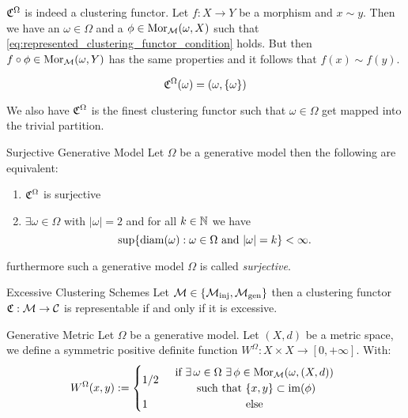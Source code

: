$\mathfrak{C}^\Omega$ is indeed a clustering functor. Let $f: X \to Y$ be a morphism and $x \sim y$. Then we have an $\omega \in \Omega$ and a $\phi \in \mathrm {Mor}_{\mathcal{M}}(\omega, X)$ such that \eqref{eq:represented_clustering_functor_condition} holds. But then $f \circ \phi \in \mathrm {Mor}_{\mathcal{M}}(\omega,Y)$ has the same properties and it follows that $f(x) \sim f(y)$.

\begin{myremark}{}{}

$$
\mathfrak{C}^\Omega(\omega) = (\omega, \{\omega\})
$$

We also have $\mathfrak{C}^\Omega$ is the finest clustering functor such that $\omega \in \Omega$ get mapped into the trivial partition.
\end{myremark}

\begin{proposition}{Surjective Generative Model}{}
\newresult
Let $\Omega$ be a generative model then the following are equivalent:
\begin{enumerate}
    \item $\mathfrak{C}^\Omega$ is surjective
    \item $\exists \omega \in \Omega$ with $|\omega| = 2$ and for all $k \in \mathbb N$ we have 
    $$
    \sup\{\mathrm{diam}(\omega): \omega \in \Omega \text{ and } |\omega| = k\} < \infty.
    $$ 
\end{enumerate}
furthermore such a generative model $\Omega$ is called \emph{surjective}.
\end{proposition}





\begin{theorem}{Excessive Clustering Schemes}{}
Let $\mathcal{M} \in \{{\mathcal{M}_\mathrm{inj}}, {\mathcal{M}_\mathrm{gen}}\}$ then a clustering functor $\mathfrak{C}: \mathcal{M} \to \mathcal{C}$ is representable if and only if it is excessive.
\end{theorem}

\begin{definition}{Generative Metric \cite{Carlsson2010}}{}
Let $\Omega$ be a generative model. Let $(X,d)$ be a metric space, we define a symmetric positive definite function $W^\Omega: X \times X \to [0,+\infty]$. With:
\begin{equation*}
W^\Omega(x,y) := \begin{cases}
    1/2 & 
    \begin{array}{cc}
         \text{if } \exists \, \omega \in \Omega \ \exists \, \phi \in \mor_{\M}(\omega, (X,d))\\
         \text{ such that } \{x,y\} \subset \image(\phi)
    \end{array}\\
    1 & \hfil \text{else}
\end{cases}
\end{equation*}
\end{definition}




